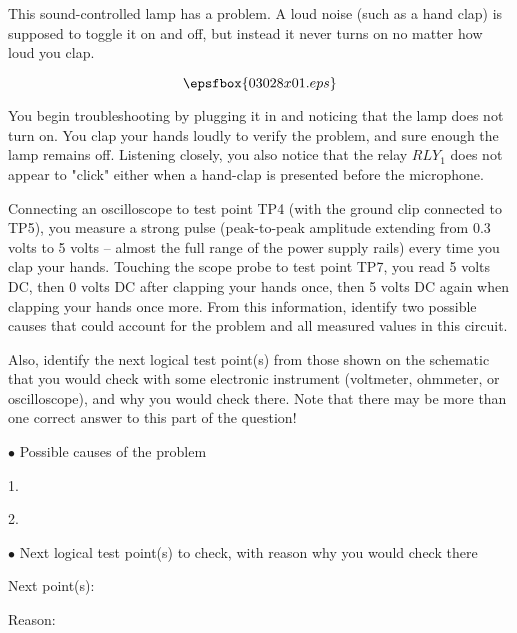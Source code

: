 

This sound-controlled lamp has a problem.  A loud noise (such as a hand clap) is supposed to toggle it on and off, but instead it never turns on no matter how loud you clap.

$$\epsfbox{03028x01.eps}$$

You begin troubleshooting by plugging it in and noticing that the lamp does not turn on.  You clap your hands loudly to verify the problem, and sure enough the lamp remains off.  Listening closely, you also notice that the relay $RLY_1$ does not appear to "click" either when a hand-clap is presented before the microphone.  

Connecting an oscilloscope to test point TP4 (with the ground clip connected to TP5), you measure a strong pulse (peak-to-peak amplitude extending from 0.3 volts to 5 volts -- almost the full range of the power supply rails) every time you clap your hands.  Touching the scope probe to test point TP7, you read 5 volts DC, then 0 volts DC after clapping your hands once, then 5 volts DC again when clapping your hands once more.  From this information, identify two possible causes that could account for the problem and all measured values in this circuit.

Also, identify the next logical test point(s) from those shown on the schematic that you would check with some electronic instrument (voltmeter, ohmmeter, or oscilloscope), and why you would check there.  Note that there may be more than one correct answer to this part of the question!

\medskip
\goodbreak
\item{$\bullet$} Possible causes of the problem
\item{1.}
\item{2.} 
\medskip

\medskip
\item{$\bullet$} Next logical test point(s) to check, with reason why you would check there
\item{Next point(s):}
\item{Reason:}
\medskip







